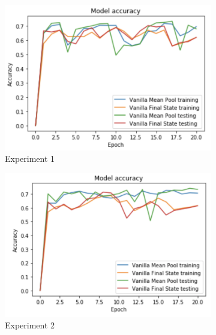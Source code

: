 \documentclass[12pt,letterpaper]{article}
\begin{document}
\begin{figure}[h]
    \begin{subfigure}{0.32\textwidth}
    \includegraphics[width=\linewidth]{vanilla_compare_final&meanpool_1.png}
    \caption{\small Experiment 1} \label{fig:e}
    \end{subfigure}\hspace*{\fill}
    \begin{subfigure}{0.32\textwidth}
    \includegraphics[width=\linewidth]{vanilla_compare_final&meanpool_2.png}
    \caption{\small Experiment 2} \label{fig:f}
    \end{subfigure}
    \begin{subfigure}{0.32\textwidth}

\end{subfigure}
\end{figure}
\end{document}
